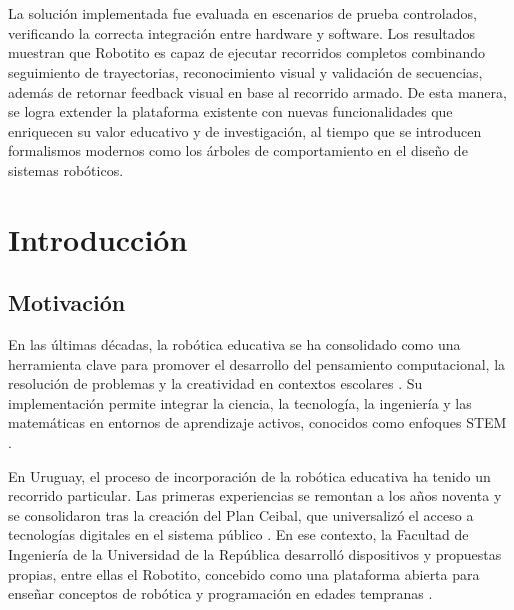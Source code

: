 \documentclass{prgrado}
\begin{document}
\\\\
\noindent La solución implementada fue evaluada en escenarios de prueba controlados, verificando la correcta integración entre hardware y software. Los resultados muestran que Robotito es capaz de ejecutar recorridos completos combinando seguimiento de trayectorias, reconocimiento visual y validación de secuencias, además de retornar feedback visual en base al recorrido armado. De esta manera, se logra extender la plataforma existente con nuevas funcionalidades que enriquecen su valor educativo y de investigación, al tiempo que se introducen formalismos modernos como los árboles de comportamiento en el diseño de sistemas robóticos.

\hfill \break
{}


\tableofcontents
\newpage



\mainmatter %

\chapter{Introducción}

\section{Motivación}
En las últimas décadas, la robótica educativa se ha consolidado como una herramienta clave para promover el desarrollo del pensamiento computacional, la resolución de problemas y la creatividad en contextos escolares \cite{anwar2019educational,ouyang2024effects}. Su implementación permite integrar la ciencia, la tecnología, la ingeniería y las matemáticas en entornos de aprendizaje activos, conocidos como enfoques STEM \cite{ncsesNDstem}.

En Uruguay, el proceso de incorporación de la robótica educativa ha tenido un recorrido particular. Las primeras experiencias se remontan a los años noventa y se consolidaron tras la creación del Plan Ceibal, que universalizó el acceso a tecnologías digitales en el sistema público \cite{uruguay2007decreto144,anepNDceibal}. En ese contexto, la Facultad de Ingeniería de la Universidad de la República desarrolló dispositivos y propuestas propias, entre ellas el Robotito, concebido como una plataforma abierta para enseñar conceptos de robótica y programación en edades tempranas \cite{abeldano2024robotito}. 
\end{document}
